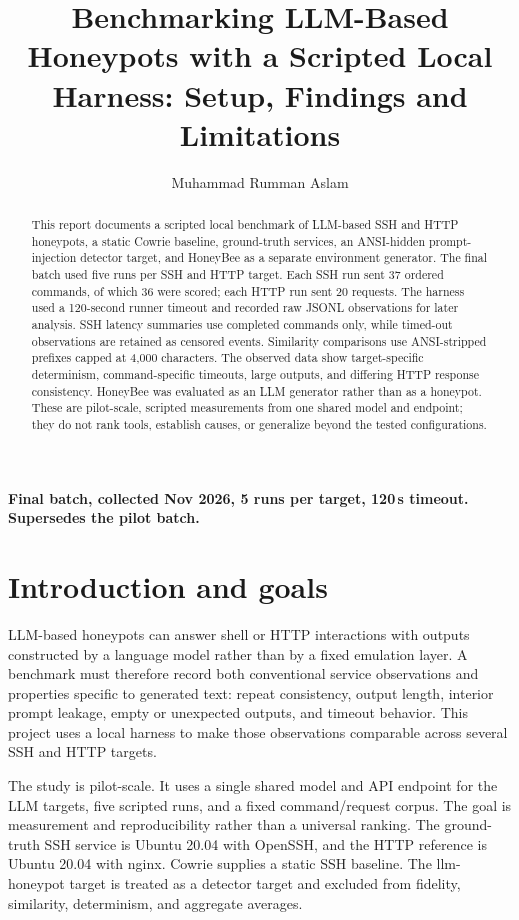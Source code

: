 \documentclass[a4paper,11pt]{article}
\title{\textbf{Benchmarking LLM-Based Honeypots with a Scripted Local Harness: Setup, Findings and Limitations}}
\author{Muhammad Rumman Aslam}
\date{}
\begin{document}
\maketitle

\begin{center}
\textbf{Final batch, collected Nov 2026, 5 runs per target, 120\,s timeout.
Supersedes the pilot batch.}
\end{center}

\begin{abstract}
This report documents a scripted local benchmark of LLM-based SSH and HTTP
honeypots, a static Cowrie baseline, ground-truth services, an ANSI-hidden
prompt-injection detector target, and HoneyBee as a separate environment
generator. The final batch used five runs per SSH and HTTP target. Each SSH
run sent 37 ordered commands, of which 36 were scored; each HTTP run sent 20
requests. The harness used a 120-second runner timeout and recorded raw JSONL
observations for later analysis. SSH latency summaries use completed commands
only, while timed-out observations are retained as censored events. Similarity
comparisons use ANSI-stripped prefixes capped at 4,000 characters. The
observed data show target-specific determinism, command-specific timeouts,
large outputs, and differing HTTP response consistency. HoneyBee was evaluated
as an LLM generator rather than as a honeypot. These are pilot-scale,
scripted measurements from one shared model and endpoint; they do not rank
tools, establish causes, or generalize beyond the tested configurations.
\end{abstract}

\section{Introduction and goals}

LLM-based honeypots can answer shell or HTTP interactions with outputs
constructed by a language model rather than by a fixed emulation layer. A
benchmark must therefore record both conventional service observations and
properties specific to generated text: repeat consistency, output length,
interior prompt leakage, empty or unexpected outputs, and timeout behavior.
This project uses a local harness to make those observations comparable across
several SSH and HTTP targets.

The study is pilot-scale. It uses a single shared model and API endpoint for
the LLM targets, five scripted runs, and a fixed command/request corpus. The
goal is measurement and reproducibility rather than a universal ranking. The
ground-truth SSH service is Ubuntu 20.04 with OpenSSH, and the HTTP reference
is Ubuntu 20.04 with nginx. Cowrie supplies a static SSH baseline. The
llm-honeypot target is treated as a detector target and excluded from fidelity,
similarity, determinism, and aggregate averages.
\end{document}
